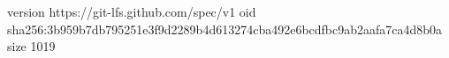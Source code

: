 version https://git-lfs.github.com/spec/v1
oid sha256:3b959b7db795251e3f9d2289b4d613274cba492e6bcdfbc9ab2aafa7ca4d8b0a
size 1019
